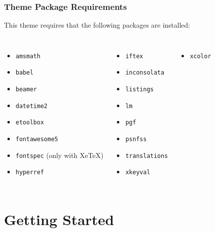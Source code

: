 \documentclass[utf8,aspectratio=169,ngerman,english]{beamer}
\begin{document}
\begin{frame}
\frametitle{Theme Package Requirements}

This theme requires that the following packages are installed:
\begin{columns}[onlytextwidth]
\begin{itemize}
\item \texttt{amsmath}
\item \texttt{babel}
\item \texttt{beamer}
\item \texttt{datetime2}
\item \texttt{etoolbox}
\item \texttt{fontawesome5}
\item \texttt{fontspec} (only with XeTeX)
\item \texttt{hyperref}
\end{itemize}

\begin{itemize}
\item \texttt{iftex}
\item \texttt{inconsolata}
\item \texttt{listings}
\item \texttt{lm}
\item \texttt{pgf}
\item \texttt{psnfss}
\item \texttt{translations}
\item \texttt{xkeyval}
\end{itemize}

\begin{itemize}
\item \texttt{xcolor}
\end{itemize}
\end{columns}
\end{frame}


\section{Getting Started}
\end{document}
